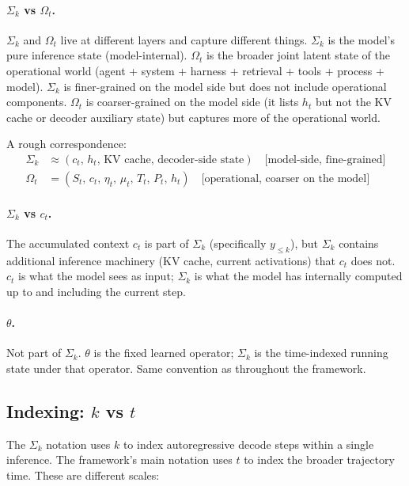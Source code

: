 \documentclass[11pt]{article}
\begin{document}
\paragraph{$\Sigma_k$ vs $\Omega_t$.} $\Sigma_k$ and $\Omega_t$ live at different layers and capture different things. $\Sigma_k$ is the model's pure inference state (model-internal). $\Omega_t$ is the broader joint latent state of the operational world (agent + system + harness + retrieval + tools + process + model). $\Sigma_k$ is finer-grained on the model side but does not include operational components. $\Omega_t$ is coarser-grained on the model side (it lists $h_t$ but not the KV cache or decoder auxiliary state) but captures more of the operational world.

A rough correspondence:
\begin{align*}
\Sigma_k &\approx (c_t,\, h_t,\, \text{KV cache},\, \text{decoder-side state}) \quad \text{[model-side, fine-grained]} \\
\Omega_t &= (S_t,\, c_t,\, \eta_t,\, \mu_t,\, T_t,\, P_t,\, h_t) \quad \text{[operational, coarser on the model]}
\end{align*}

\paragraph{$\Sigma_k$ vs $c_t$.} The accumulated context $c_t$ is part of $\Sigma_k$ (specifically $y_{\le k}$), but $\Sigma_k$ contains additional inference machinery (KV cache, current activations) that $c_t$ does not. $c_t$ is what the model sees as input; $\Sigma_k$ is what the model has internally computed up to and including the current step.

\paragraph{$\theta$.} Not part of $\Sigma_k$. $\theta$ is the fixed learned operator; $\Sigma_k$ is the time-indexed running state under that operator. Same convention as throughout the framework.

\subsection*{Indexing: $k$ vs $t$}

The $\Sigma_k$ notation uses $k$ to index autoregressive decode steps within a single inference. The framework's main notation uses $t$ to index the broader trajectory time. These are different scales:
\end{document}
